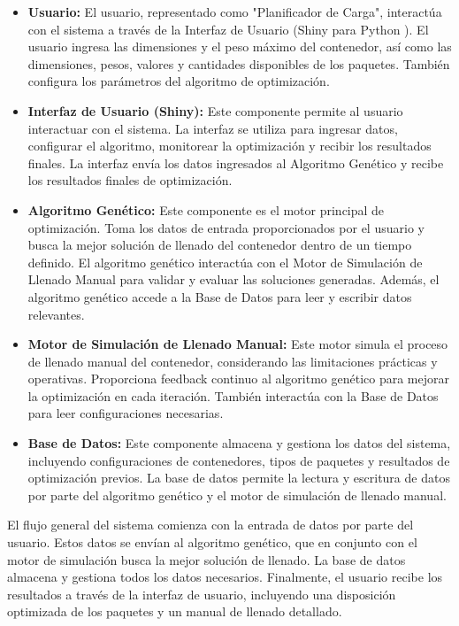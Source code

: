 \documentclass[9pt,a4paper]{rho}
\begin{document}
\begin{itemize}
    \item \textbf{Usuario:} El usuario, representado como "Planificador de Carga", interactúa con el sistema a través de la Interfaz de Usuario (Shiny para Python \cite{shiny_intro}). El usuario ingresa las dimensiones y el peso máximo del contenedor, así como las dimensiones, pesos, valores y cantidades disponibles de los paquetes. También configura los parámetros del algoritmo de optimización.
    \item \textbf{Interfaz de Usuario (Shiny):} Este componente permite al usuario interactuar con el sistema. La interfaz se utiliza para ingresar datos, configurar el algoritmo, monitorear la optimización y recibir los resultados finales. La interfaz envía los datos ingresados al Algoritmo Genético y recibe los resultados finales de optimización.
    \item \textbf{Algoritmo Genético:} Este componente es el motor principal de optimización. Toma los datos de entrada proporcionados por el usuario y busca la mejor solución de llenado del contenedor dentro de un tiempo definido. El algoritmo genético interactúa con el Motor de Simulación de Llenado Manual para validar y evaluar las soluciones generadas. Además, el algoritmo genético accede a la Base de Datos para leer y escribir datos relevantes.
    \item \textbf{Motor de Simulación de Llenado Manual:} Este motor simula el proceso de llenado manual del contenedor, considerando las limitaciones prácticas y operativas. Proporciona feedback continuo al algoritmo genético para mejorar la optimización en cada iteración. También interactúa con la Base de Datos para leer configuraciones necesarias.
    \item \textbf{Base de Datos:} Este componente almacena y gestiona los datos del sistema, incluyendo configuraciones de contenedores, tipos de paquetes y resultados de optimización previos. La base de datos permite la lectura y escritura de datos por parte del algoritmo genético y el motor de simulación de llenado manual.
\end{itemize}

El flujo general del sistema comienza con la entrada de datos por parte del usuario. Estos datos se envían al algoritmo genético, que en conjunto con el motor de simulación busca la mejor solución de llenado. La base de datos almacena y gestiona todos los datos necesarios. Finalmente, el usuario recibe los resultados a través de la interfaz de usuario, incluyendo una disposición optimizada de los paquetes y un manual de llenado detallado.
\end{document}
